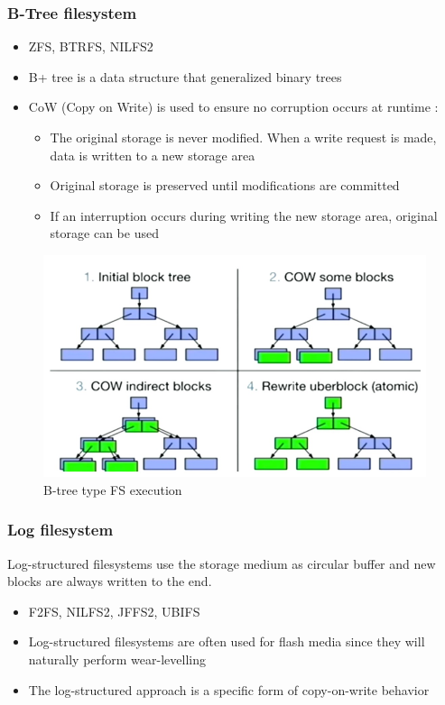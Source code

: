 \documentclass[resume]{subfiles}
\begin{document}
\subsubsection{B-Tree filesystem}
\begin{itemize}
    \item ZFS, BTRFS, NILFS2
    \item B+ tree is a data structure that generalized binary trees
    \item CoW (Copy on Write) is used to ensure no corruption occurs at runtime :
    \begin{itemize}
        \item The original storage is never modified. When a write request is made, data is written to a new storage area
        \item Original storage is preserved until modifications are committed
        \item If an interruption occurs during writing the new storage area, original storage can be used
    \end{itemize}
\end{itemize}

\begin{figure}[H]
    \centering
    \includegraphics[width=1\columnwidth]{Figures/fileSystem/b-tree.png}
    \caption{B-tree type FS execution}
    \label{fig:b-tree}
\end{figure}

\subsubsection{Log filesystem}
Log-structured filesystems use the storage medium as circular buffer and new
blocks are always written to the end.
\begin{itemize}
    \item F2FS, NILFS2, JFFS2, UBIFS
    \item Log-structured filesystems are often used for flash media since they will naturally perform wear-levelling
    \item The log-structured approach is a specific form of copy-on-write behavior
\end{itemize}
\end{document}
